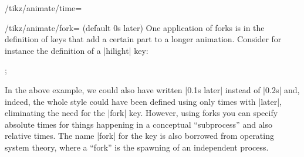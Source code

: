 \begin{key}{/tikz/animate/time=}
\begin{key}{/tikz/animate/fork= (default 0s later)}
    One application of forks is in the definition of keys that add a
    certain part to a longer animation. Consider for instance the
    definition of a |hilight| key:
\begin{codeexample}[animation list={1.05,1.1,1.15,1.2,2.05,2.1,2.15,2.2}]
\tikz [animate/highlight/.style = {
    scope = { fork = #1,
              :fill = { 0s = "black", 0.1s = "white", 0.2s = "black"} }
  }]
  ;
\end{codeexample}
    In the above example, we could also have written |0.1s later|
    instead of |0.2s| and, indeed, the whole style could have been
    defined using only times with |later|, eliminating the need for
    the |fork| key. However, using forks you can specify absolute
    times for things happening in a conceptual ``subprocess'' and also
    relative times. The name |fork| for the key is also borrowed from
    operating system theory, where a ``fork'' is the spawning of an
    independent process. 
  \end{key}


\end{key}
